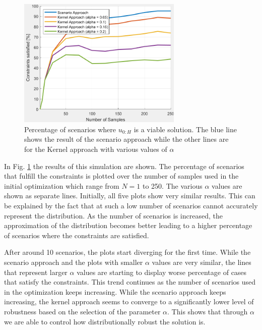 \begin{figure}[htb]
\centering
\includegraphics[width=0.7\textwidth]{pics/robustness_plot.png}
\caption{Percentage of scenarios where $u_{0:H}$ is a viable solution. The blue line shows the result of the scenario approach while the other lines are for the Kernel approach with various values of $\alpha$}
\label{fig:robustness_plot}
\end{figure}

In Fig. \ref{fig:robustness_plot} the results of this simulation are shown. The percentage of scenarios that fulfill the constraints is plotted over the number of samples used in the initial optimization which range from $N = 1$ to 250. The various $\alpha$ values are shown as separate lines. Initially, all five plots show very similar results. This can be explained by the fact that at such a low number of scenarios cannot accurately represent the distribution. As the number of scenarios is increased, the approximation of the distribution becomes better leading to a higher percentage of scenarios where the constraints are satisfied.

After around 10 scenarios, the plots start diverging for the first time. While the scenario approach and the plots with smaller $\alpha$ values are very similar, the lines that represent larger $\alpha$ values are starting to display worse percentage of cases that satisfy the constraints. This trend continues as the number of scenarios used in the optimization keeps increasing. While the scenario approach keeps increasing, the kernel approach seems to converge to a significantly lower level of robustness based on the selection of the parameter $\alpha$. This shows that through $\alpha$ we are able to control how distributionally robust the solution is.

 

